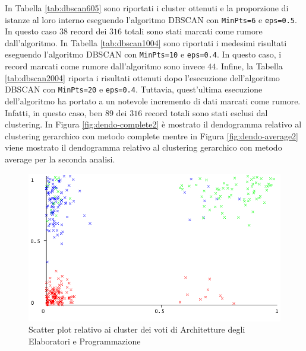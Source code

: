 \documentclass[12pt]{article}
\begin{document}
In Tabella \ref{tab:dbscan605} sono riportati i cluster ottenuti e la proporzione di istanze al loro interno eseguendo l'algoritmo DBSCAN con \texttt{MinPts=6} e \texttt{eps=0.5}. 
In questo caso $38$ record dei $316$ totali sono stati marcati come rumore dall'algoritmo. 
In Tabella \ref{tab:dbscan1004} sono riportati i medesimi risultati eseguendo l'algoritmo DBSCAN con \texttt{MinPts=10} e \texttt{eps=0.4}. 
In questo caso, i record marcati come rumore dall'algoritmo sono invece $44$. 
Infine, la Tabella \ref{tab:dbscan2004} riporta i risultati ottenuti dopo l'esecuzione dell'algoritmo DBSCAN con \texttt{MinPts=20} e \texttt{eps=0.4}. 
Tut\-tavia, quest'ultima esecuzione dell'algoritmo ha portato a un notevole incre\-mento di dati marcati come rumore. Infatti, in questo caso, ben $89$ dei $316$ record totali sono stati esclusi dal clustering. In Figura \ref{fig:dendo-complete2} è mostrato il dendogramma relativo al clustering gerarchico con metodo complete mentre in Figura \ref{fig:dendo-average2} viene mostrato il dendogramma relativo al clustering gerarchico con metodo average per la seconda analisi. 
\begin{figure}[H]
	\includegraphics[width=\textwidth]{img/ARC-PRG-Cluster.png}
	\captionsetup{justification=centering}
	\caption{Scatter plot relativo ai cluster dei voti di Architetture degli Elaboratori e Programmazione}
	\label{APC}
\end{figure}
\end{document}
